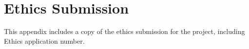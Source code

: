 \chapter{Ethics Submission}

This appendix includes a copy of the ethics submission for the project, including Ethics application number.

